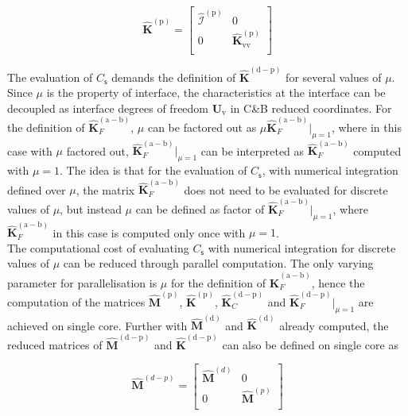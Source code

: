    \begin{equation}
 \mathbf{\hat{K}}^{\mathrm{(p)}}=\left[
\begin{array}{cccc}
  \mathcal{\hat I}^{(\mathrm p)} &0\\
  0&\mathbf{\hat{K}}_{\mathrm{vv}}^{(\mathrm p)} \\
\end{array}
\right] 
 \end{equation}
 
 The evaluation of $C_{\mathsf s}$ demands the definition of  $\mathbf{\hat{K}}^{\mathrm{(d-p)}}$ for several values of $\mu$. Since $\mu$ is the property of interface, the characteristics at the interface can be decoupled as interface degrees of freedom $\bm U_{\mathrm{v}}$ in C\&B reduced coordinates. For the definition of $\mathbf{\hat K}_F^{\mathrm{(a-b)}}$, $\mu$ can be factored out as  $\mu \mathbf{\hat K}_F^{\mathrm{(a-b)}}|_{\mu=1}$, where in this case with $\mu$ factored out,  $\mathbf{\hat K}_F^{\mathrm{(a-b)}}|_{\mu=1}$ can be interpreted as $\mathbf{\hat K}_F^{\mathrm{(a-b)}}$ computed with $\mu=1$. The idea is that for the evaluation of $C_{\mathsf s}$, with numerical integration defined over $\mu$, the matrix $\mathbf{\hat K}_F^{\mathrm{(a-b)}}$ does not need to be evaluated for discrete values of $\mu$, but instead $\mu$ can be defined as factor of $\mathbf{\hat K}_F^{\mathrm{(a-b)}}|_{\mu=1}$, where $\mathbf{\hat K}_F^{\mathrm{(a-b)}}$ in this case is computed only once with $\mu=1$.\\ 
 
 
The computational cost of evaluating $C_{\mathsf s}$ with numerical integration for discrete values of ${\mu}$ can be reduced through 
 parallel computation. The only varying parameter for parallelisation is $\mu$ for the definition of $\mathbf{\hat K}_F^{\mathrm{(a-b)}}$, hence the computation of the matrices  $\mathbf{\hat{M}}^{\mathrm{(p)}}$, $\mathbf{\hat{K}}^{\mathrm{(p)}}$, $\mathbf{\hat{K}}^{\mathrm{(d-p)}}_C$ and $\mathbf{\hat{K}}^{\mathrm{(d-p)}}_F|_{\mu=1}$ are achieved on single core. Further with $\mathbf{\hat{M}}^{\mathrm{(d)}}$ and $\mathbf{\hat{K}}^{\mathrm{(d)}}$ already computed, the reduced matrices of $\mathbf{\hat{M}}^\mathrm{(d-p)}$ and $\mathbf{\hat{K}}^\mathrm{(d-p)}$ can also be defined on single core as
 
  \begin{equation}
 \mathbf{\hat{M}}^{(d-p)}=\left[
\begin{array}{cc}
  {{\mathbf{\hat M}}}^{(d)} &0\\
  0&{\mathbf{\hat M}}^{(p)} \\
\end{array}
\right] 
 \end{equation}
 

